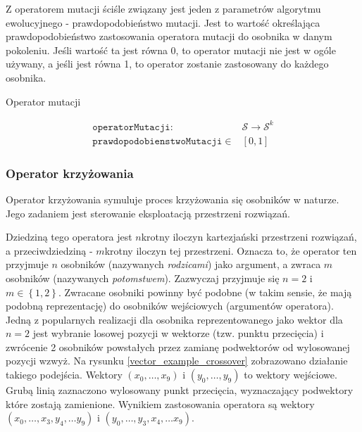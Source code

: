 \documentclass[twoside]{iisthesis}
\newcommand{\important}{\mathcal}
\newcommand{\param}{\mathtt}
\begin{document}
Z operatorem mutacji ściśle związany jest jeden z parametrów algorytmu ewolucyjnego - prawdopodobieństwo mutacji. Jest to wartość określająca prawdopodobieństwo zastosowania operatora mutacji do osobnika w danym pokoleniu. Jeśli wartość ta jest równa 0, to operator mutacji nie jest w ogóle używany, a jeśli jest równa 1, to operator zostanie zastosowany do każdego osobnika.

\begin{signature}
	\caption{Operator mutacji \label{signature_mutation}}
	\begin{align}
	\param{operatorMutacji}: &\important{S} \rightarrow \important{S}^k \\
	\param{prawdopodobienstwoMutacji} \in &[0, 1]
	\end{align}
\end{signature}	

\subsubsection{Operator krzyżowania} \label{subsection_crossover}

Operator krzyżowania symuluje proces krzyżowania się osobników w naturze. Jego zadaniem jest sterowanie eksploatacją przestrzeni rozwiązań.

Dziedziną tego operatora jest $n$krotny iloczyn kartezjański przestrzeni rozwiązań, a przeciwdziedziną - $m$krotny iloczyn tej przestrzeni. Oznacza to, że operator ten przyjmuje $n$ osobników (nazywanych \emph{rodzicami}) jako argument, a zwraca $m$ osobników (nazywanych \emph{potomstwem}). Zazwyczaj przyjmuje się $ n = 2 $ i $m \in \left\{1, 2 \right\}$. Zwracane osobniki powinny być podobne (w takim sensie, że mają podobną reprezentację) do osobników wejściowych (argumentów operatora). 
Jedną z popularnych realizacji dla osobnika reprezentowanego jako wektor dla $n=2$ jest wybranie losowej pozycji w wektorze (tzw. punktu przecięcia) i zwrócenie 2 osobników powstałych przez zamianę podwektorów od wylosowanej pozycji wzwyż. Na rysunku \ref{vector_example_crossover} zobrazowano działanie takiego podejścia. Wektory $(x_0, \ldots, x_9)$ i $(y_0, \ldots, y_9)$ to wektory wejściowe. Grubą linią zaznaczono wylosowany punkt przecięcia, wyznaczający podwektory które zostają zamienione. Wynikiem zastosowania operatora są wektory $(x_0, \ldots, x_3, y_4, \ldots y_9)$ i $(y_0, \ldots, y_3, x_4, \ldots x_9)$.
\end{document}
